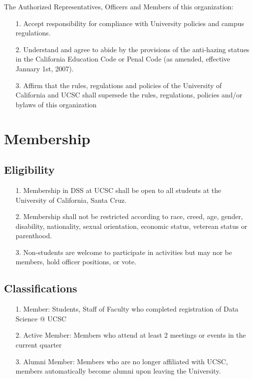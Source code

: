 \documentclass{article}
\begin{document}
The Authorized Representatives, Officers and Members of this organization:
\begin{itemize}
    \item[1.] Accept responsibility for compliance with University policies and campus regulations.
    \item[2.] Understand and agree to abide by the provisions of the anti-hazing statues in the California Education Code or Penal Code (as amended, effective January 1st, 2007).
    \item[3.] Affirm that the rules, regulations and policies of the University of California and UCSC shall supersede the rules, regulations, policies and/or bylaws of this organization 
 
\end{itemize}


\section{Membership}

\subsection{Eligibility}
\begin{itemize}
    \item[1.] Membership in DSS at UCSC shall be open to all students at the University of California, Santa Cruz.
    \item[2.] Membership shall not be restricted according to race, creed, age, gender, 
    disability, nationality, sexual orientation, economic status, veterean status or parenthood.
    \item[3.] Non-students are welcome to participate in activities but may nor be members,
    hold officer positions, or vote.  
\end{itemize} 


\subsection{Classifications}
\begin{itemize}
    \item[1.] Member: Students, Staff of Faculty who completed registration of Data Science @ UCSC
    \item[2.] Active Member: Members who attend at least 2 meetings or events in the current quarter
    \item[3.] Alumni Member: Members who are no longer affiliated with UCSC, members automatically become alumni upon leaving the University. 
\end{itemize}
\end{document}
